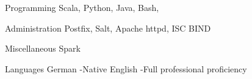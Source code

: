 

\begin{cvskills}

  \cvskill
    {Programming} %
    {Scala, Python, Java, Bash, \LaTeXe} %

  \cvskill
    {Administration} %
    {Postfix, Salt, Apache httpd, ISC BIND} %

  \cvskill
    {Miscellaneous} %
    {Spark} %

  \cvskill
    {Languages} %
    {German \hspace{1mm}-\hspace{1mm}Native} %
  \cvskill
    {} %
    {English \hspace{2.1mm}-\hspace{1mm}Full professional proficiency} %

\end{cvskills}
